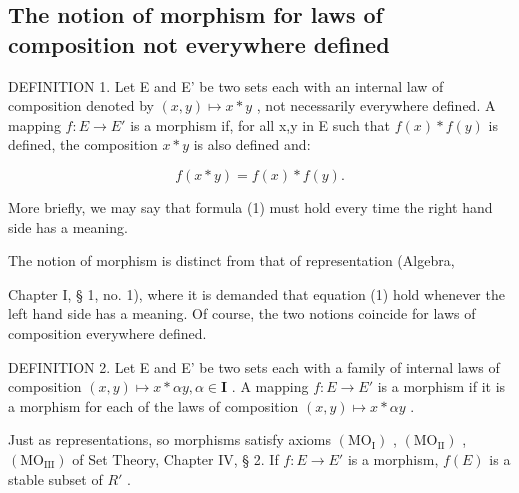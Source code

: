 \subsection{The notion of morphism for laws of composition not everywhere defined}

DEFINITION 1. Let E and E' be two sets each with an internal law of composition denoted by \((x,y)\mapsto x*y\) , not necessarily everywhere defined. A mapping \(f:E\to E'\) is a morphism if, for all x,y in E such that \(f(x)*f(y)\) is defined, the composition \(x*y\) is also defined and:

\[
f (x * y) = f (x) * f (y).\tag{1}
\]

More briefly, we may say that formula (1) must hold every time the right hand side has a meaning.

The notion of morphism is distinct from that of representation (Algebra,

Chapter I, § 1, no. 1), where it is demanded that equation (1) hold whenever the left hand side has a meaning. Of course, the two notions coincide for laws of composition everywhere defined.

DEFINITION 2. Let E and E' be two sets each with a family of internal laws of composition \((x,y)\mapsto x*\alpha y,\alpha\in\mathbf{I}\) . A mapping \(f:E\to E'\) is a morphism if it is a morphism for each of the laws of composition \((x,y)\mapsto x*\alpha y\) .

Just as representations, so morphisms satisfy axioms \((\mathrm{MO}_{\mathrm{I}})\) , \((\mathrm{MO}_{\mathrm{II}})\) , \((\mathrm{MO}_{\mathrm{III}})\) of Set Theory, Chapter IV, § 2. If \(f: E \to E'\) is a morphism, \(f(E)\) is a stable subset of \(R'\) .

